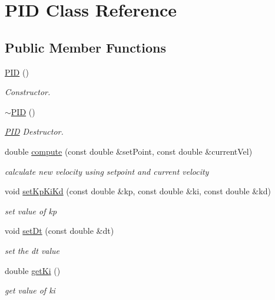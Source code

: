 \hypertarget{class_p_i_d}{}\section{P\+ID Class Reference}
\label{class_p_i_d}
\subsection*{Public Member Functions}
\begin{DoxyCompactItemize}
\item 
\hyperlink{class_p_i_d_a0311b6f7de348499ce24e53ba353514a}{P\+ID} ()
\begin{DoxyCompactList}\small\item\em Constructor. \end{DoxyCompactList}\item 
\hyperlink{class_p_i_d_ab7d389fc5b88d881bc25f5dafd360441}{$\sim$\+P\+ID} ()
\begin{DoxyCompactList}\small\item\em \hyperlink{class_p_i_d}{P\+ID} Destructor. \end{DoxyCompactList}\item 
double \hyperlink{class_p_i_d_a3e20a1cc8818522f48a66ad8482cb2d3}{compute} (const double \&set\+Point, const double \&current\+Vel)
\begin{DoxyCompactList}\small\item\em calculate new velocity using setpoint and current velocity \end{DoxyCompactList}\item 
void \hyperlink{class_p_i_d_a4655b871bfe018f4ea1c5607d91ee74b}{set\+Kp\+Ki\+Kd} (const double \&kp, const double \&ki, const double \&kd)
\begin{DoxyCompactList}\small\item\em set value of kp \end{DoxyCompactList}\item 
void \hyperlink{class_p_i_d_a116fdab357eaf0007c80fe2f65bbb7d9}{set\+Dt} (const double \&dt)
\begin{DoxyCompactList}\small\item\em set the dt value \end{DoxyCompactList}\item 
double \hyperlink{class_p_i_d_a89dedae29ef5a1359fd438824523bfc5}{get\+Ki} ()
\begin{DoxyCompactList}\small\item\em get value of ki \end{DoxyCompactList}\item 

\end{DoxyCompactItemize}
